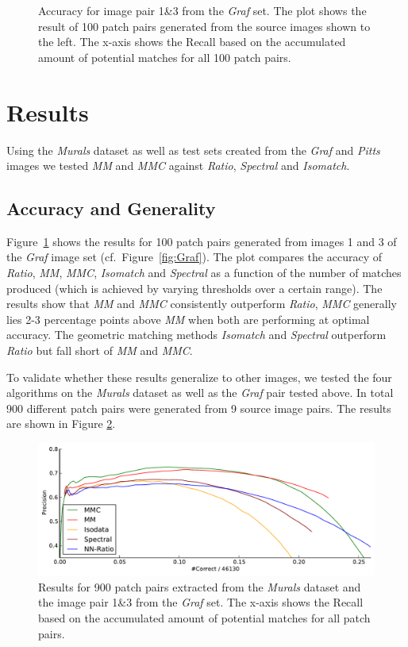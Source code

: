 \begin{figure}[t]
\begin{subfigure}[c]{0.8\textwidth}
	\end{subfigure}%
	\caption{Accuracy for image pair 1\&3 from the \emph{Graf} set. The 
	plot shows the result of 100 patch pairs generated from the source 
	images shown to the left. The x-axis shows the Recall based on the 
accumulated amount of potential matches for all 100 patch pairs. }
	\label{fig:result_graf}
\end{figure}

\section{Results}
\label{S:Results}

Using the \emph{Murals} dataset as well as test sets created from the 
\emph{Graf} and \emph{Pitts} images we tested \emph{MM} and \emph{MMC} 
against \emph{Ratio}, \emph{Spectral} and \emph{Isomatch}.

\subsection{Accuracy and Generality}

Figure~\ref{fig:result_graf} shows the results for 100 patch pairs 
generated from images 1 and 3 of the \emph{Graf} image set 
(cf.~Figure~\ref{fig:Graf}). The plot compares the accuracy of 
\emph{Ratio}, \emph{MM}, \emph{MMC}, \emph{Isomatch} and \emph{Spectral} 
as a function of the number of matches produced (which is achieved by 
varying thresholds over a certain range). The results show that 
\emph{MM} and \emph{MMC} consistently outperform \emph{Ratio}, 
\emph{MMC} generally lies 2-3 percentage points above \emph{MM} when 
both are performing at optimal accuracy.  The geometric matching methods 
\emph{Isomatch} and \emph{Spectral} outperform \emph{Ratio} but fall 
short of \emph{MM} and \emph{MMC}.


To validate whether these results generalize to other images, we tested 
the four algorithms on the \emph{Murals} dataset as well as the 
\emph{Graf} pair tested above.  In total 900 different patch pairs were 
generated from 9 source image pairs.  The results are shown in Figure 
\ref{fig:result_accumulated}. 

\begin{figure}[htb]
	\centering
	\includegraphics[width=\columnwidth]{images/result_accumulated}
	\caption{Results for 900 patch pairs extracted from the 
	\emph{Murals} dataset and the image pair 1\&3 from the \emph{Graf} 
	set.  The x-axis shows the Recall based on the accumulated amount of 
potential matches for all patch pairs.}
	\label{fig:result_accumulated}
\end{figure}

